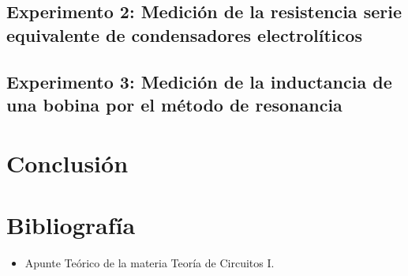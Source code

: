 \newpage
\vspace{1.5cm}
\subsection{Experimento 2: Medición de la resistencia serie equivalente de condensadores
electrolíticos}


\newpage

\subsection{Experimento 3: Medición de la inductancia de una bobina por el método de resonancia}



\newpage
\section{Conclusión}




\vspace{3cm}
\section{Bibliografía}
\begin{itemize}

   \item Apunte Teórico de la materia Teoría de Circuitos I.
\end{itemize}

%

